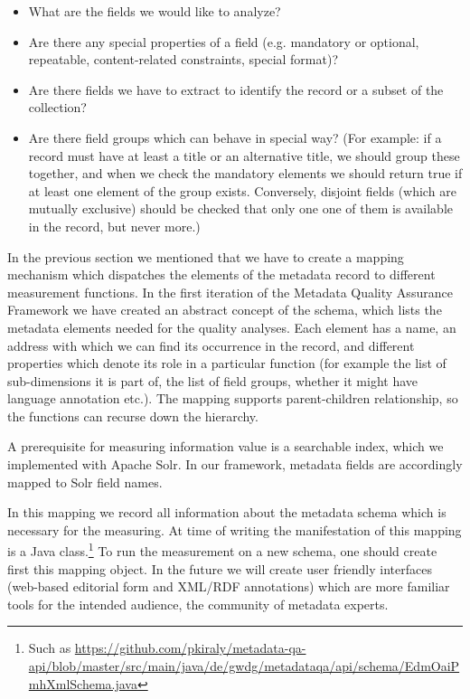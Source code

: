 \begin{itemize}
 \setlength{\parskip}{0pt}
 \setlength{\itemsep}{0pt plus 1pt}
\item What are the fields we would like to analyze?
\item Are there any special properties of a field (e.g. mandatory or optional, repeatable, content-related constraints, special format)?
\item Are there fields we have to extract to identify the record or a subset of the collection?
\item Are there field groups which can behave in special way? (For example: if a record must have at least a title or an alternative title, we should group these together, and when we check the mandatory elements we should return true if at least one element of the group exists. Conversely, disjoint fields (which are mutually exclusive) should be checked that only one one of them is available in the record, but never more.)
\end{itemize}

In the previous section we mentioned that we have to create a mapping mechanism which dispatches the elements of the metadata record to different measurement functions. In the first iteration of the Metadata Quality Assurance Framework we have created an abstract concept of the schema, which lists the metadata elements needed for the quality analyses. Each element has a name, an address with which we can find its occurrence in the record, and different properties which denote its role in a particular function (for example the list of sub-dimensions it is part of, the list of field groups, whether it might have language annotation etc.). The mapping supports parent-children relationship, so the functions can recurse down the hierarchy.

A prerequisite for measuring information value is a searchable index, which we implemented with Apache Solr. In our framework, metadata fields are accordingly mapped to Solr field names.

In this mapping we record all information about the metadata schema which is necessary for the measuring. At time of writing the manifestation of this mapping is a Java class.\footnote{Such as \url{https://github.com/pkiraly/metadata-qa-api/blob/master/src/main/java/de/gwdg/metadataqa/api/schema/EdmOaiPmhXmlSchema.java}} To run the measurement on a new schema, one should create first this mapping object. In the future we will create user friendly interfaces (web-based editorial form and XML/RDF annotations) which are more familiar tools for the intended audience, the community of metadata experts.

